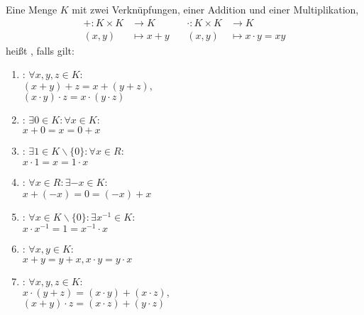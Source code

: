 Eine Menge $K$ mit zwei Verknüpfungen, einer Addition und einer Multiplikation, 
\begin{align*}
    + : K \times K & \longrightarrow K \hspace{1cm} &
    \cdot : K \times K & \longrightarrow K
    \\
    (x, y) & \longmapsto x + y &
    (x, y) & \longmapsto x \cdot y = xy
\end{align*}
heißt , falls gilt:
\begin{enumerate}[label=(K\arabic*)]
    \item {}: $\forall x, y, z \in K :$\\$(x+y)+z = x+(y+z),$\\$(x \cdot y) \cdot z = x \cdot (y \cdot z)$
    \item {}: $\exists 0 \in K : \forall x \in K :$\\$x+0=x=0+x$
    \item {}: $\exists 1 \in K \backslash \{0\} : \forall x \in R :$\\$x \cdot 1=x=1 \cdot x$
    \item {}: $\forall x \in R : \exists -x \in K :$\\$x + (-x) = 0 = (-x) + x$
    \item {}: $\forall x \in K \backslash \{0\} : \exists x^{-1} \in K :$\\$x \cdot x^{-1} = 1 = x^{-1} \cdot x$
    \item {}: $\forall x, y \in K :$\\$x+y=y+x, x \cdot y = y \cdot x$
    \item {}: $\forall x, y, z \in K :$\\$x \cdot (y+z) = (x \cdot y) + (x \cdot z),$\\$(x+y) \cdot z = (x \cdot z) + (y \cdot z)$
\end{enumerate}
